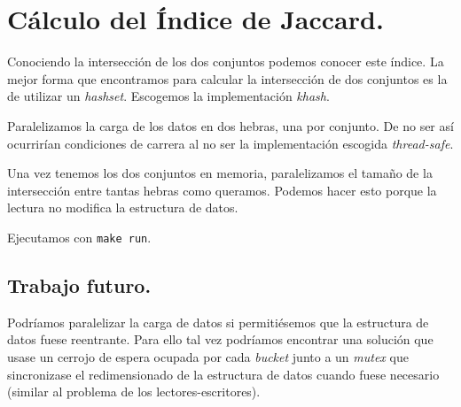 \section{Cálculo del Índice de Jaccard.}

Conociendo la intersección de los dos conjuntos podemos conocer este índice.
La mejor forma que encontramos para calcular la intersección de dos conjuntos
es la de utilizar un \textit{hashset}. Escogemos la implementación \textit{khash}.

Paralelizamos la carga de los datos en dos hebras, una por conjunto. De no ser así
ocurrirían condiciones de carrera al no ser la implementación escogida \textit{thread-safe}.

Una vez tenemos los dos conjuntos en memoria, paralelizamos el tamaño de la intersección
entre tantas hebras como queramos. Podemos hacer esto porque la lectura no modifica la
estructura de datos.

Ejecutamos con \texttt{make run}.

\subsection{Trabajo futuro.}

Podríamos paralelizar la carga de datos si permitiésemos que la estructura de datos fuese
reentrante. Para ello tal vez podríamos encontrar una solución que usase un cerrojo de espera
ocupada por cada \textit{bucket} junto a un \textit{mutex} que sincronizase el redimensionado
de la estructura de datos cuando fuese necesario (similar al problema de los lectores-escritores).